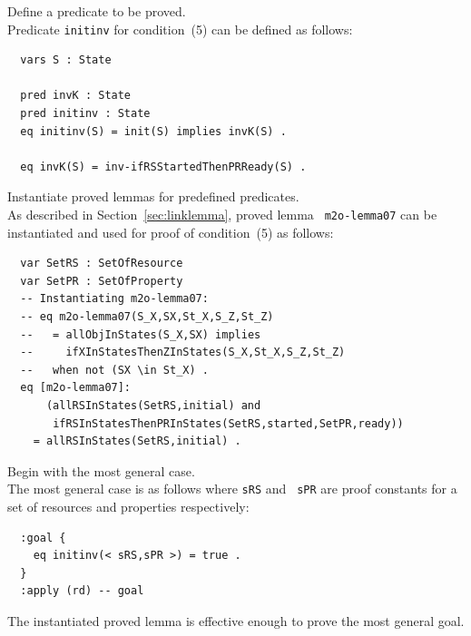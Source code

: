 \documentclass[12pt]{report}
\begin{document}
 Define a predicate to be proved. \\ Predicate
         {\tt initinv} for condition~(5) can be defined
         as follows:
\small
\begin{verbatim}
  vars S : State

  pred invK : State
  pred initinv : State
  eq initinv(S) = init(S) implies invK(S) .

  eq invK(S) = inv-ifRSStartedThenPRReady(S) .
\end{verbatim}
\normalsize

 Instantiate proved lemmas for predefined
predicates. \\
As described in Section~\ref{sec:linklemma}, proved lemma {\tt
  m2o-lemma07} can be instantiated and used for proof of
condition~(5) as follows:
\small
\begin{verbatim}
  var SetRS : SetOfResource
  var SetPR : SetOfProperty
  -- Instantiating m2o-lemma07:
  -- eq m2o-lemma07(S_X,SX,St_X,S_Z,St_Z)
  --   = allObjInStates(S_X,SX) implies 
  --     ifXInStatesThenZInStates(S_X,St_X,S_Z,St_Z)
  --   when not (SX \in St_X) .
  eq [m2o-lemma07]:
      (allRSInStates(SetRS,initial) and 
       ifRSInStatesThenPRInStates(SetRS,started,SetPR,ready))
    = allRSInStates(SetRS,initial) .
\end{verbatim}
\normalsize

 Begin with the most general case. \\
The most general case is as follows where {\tt sRS} and {\tt
  sPR} are proof constants for a set of resources and properties
respectively:
\small
\begin{verbatim}
  :goal {
    eq initinv(< sRS,sPR >) = true .
  }
  :apply (rd) -- goal
\end{verbatim}
\normalsize
The instantiated proved lemma is effective enough to prove the most
general goal.\\
\end{document}
